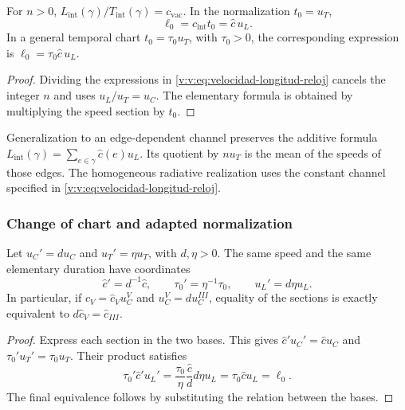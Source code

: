 \begin{corollary}
\label{v:v:cor:longitud-elemental-constitutiva}
For $n>0$, $L_{\mathrm{int}}(\gamma)/T_{\mathrm{int}}(\gamma)
=c_{\mathrm{vac}}$. In the normalization $t_0=u_T$,
\begin{equation}
 \ell_0=c_{\mathrm{int}}t_0=\widehat c\,u_L.
 \label{v:v:eq:longitud-elemental-constitutiva}
\end{equation}
In a general temporal chart $t_0=\tau_0u_T$, with $\tau_0>0$,
the corresponding expression is $\ell_0=\tau_0\widehat c\,u_L$.
\end{corollary}
\begin{proof}
Dividing the expressions in \eqref{v:v:eq:velocidad-longitud-reloj} cancels the integer
$n$ and uses $u_L/u_T=u_C$. The elementary formula is obtained
by multiplying the speed section by $t_0$.
\end{proof}

Generalization to an edge-dependent channel preserves the additive
formula $L_{\mathrm{int}}(\gamma)=\sum_{e\in\gamma}\widehat c(e)u_L$.
Its quotient by $nu_T$ is the mean of the speeds of those edges.
The homogeneous radiative realization uses the constant channel specified
in \eqref{v:v:eq:velocidad-longitud-reloj}.

\subsubsection{Change of chart and adapted normalization}

\begin{proposition}
\label{v:v:prop:covariancia-identidad-velocidad}
Let $u_C'=d u_C$ and $u_T'=\eta u_T$, with $d,\eta>0$.
The same speed and the same elementary duration have coordinates
\begin{equation}
 \widehat c'=d^{-1}\widehat c,
 \qquad \tau_0'=\eta^{-1}\tau_0,
 \qquad u_L'=d\eta u_L.
 \label{v:v:eq:velocidad-cambio-carta}
\end{equation}
In particular, if $c_V=\widehat c_Vu_C^V$ and
$u_C^V=d u_C^{III}$, equality of the sections is exactly equivalent to
$d\widehat c_V=\widehat c_{III}$.
\end{proposition}
\begin{proof}
Express each section in the two bases. This gives
$\widehat c'u_C'=\widehat c u_C$ and
$\tau_0'u_T'=\tau_0u_T$. Their product satisfies
\[
 \tau_0'\widehat c' u_L'
 =\frac{\tau_0}{\eta}\frac{\widehat c}{d}
       d\eta u_L
 =\tau_0\widehat c u_L=\ell_0.
\]
The final equivalence follows by substituting the relation between the bases.
\end{proof}

